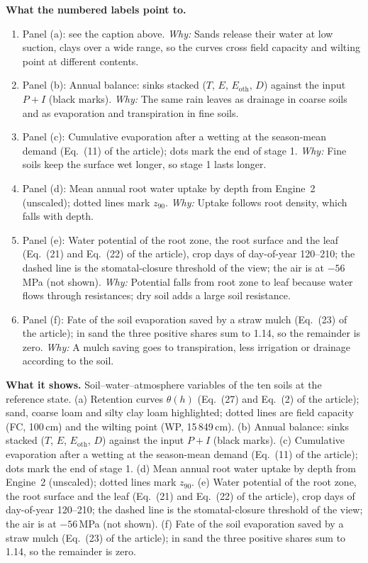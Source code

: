 \textbf{What the numbered labels point to.}
\begin{enumerate}[nosep,label=\protect\circled{\arabic*}]
\item Panel (a): see the caption above. \emph{Why:} Sands release their water at low suction, clays over a wide range, so the curves cross field capacity and wilting point at different contents.
\item Panel (b): Annual balance: sinks stacked ($T$, $E$, $E_{\mathrm{oth}}$, $D$) against the input $P+I$ (black marks). \emph{Why:} The same rain leaves as drainage in coarse soils and as evaporation and transpiration in fine soils.
\item Panel (c): Cumulative evaporation after a wetting at the season-mean demand (Eq.~(11) of the article); dots mark the end of stage 1. \emph{Why:} Fine soils keep the surface wet longer, so stage 1 lasts longer.
\item Panel (d): Mean annual root water uptake by depth from Engine~2 (unscaled); dotted lines mark $z_{90}$. \emph{Why:} Uptake follows root density, which falls with depth.
\item Panel (e): Water potential of the root zone, the root surface and the leaf (Eq.~(21) and Eq.~(22) of the article), crop days of day-of-year 120--210; the dashed line is the stomatal-closure threshold of the view; the air is at $-56$\,MPa (not shown). \emph{Why:} Potential falls from root zone to leaf because water flows through resistances; dry soil adds a large soil resistance.
\item Panel (f): Fate of the soil evaporation saved by a straw mulch (Eq.~(23) of the article); in sand the three positive shares sum to 1.14, so the remainder is zero. \emph{Why:} A mulch saving goes to transpiration, less irrigation or drainage according to the soil.
\end{enumerate}

\textbf{What it shows.} Soil--water--atmosphere variables of the ten soils at the reference state. (a) Retention curves $\theta(h)$ (Eq.~(27) and Eq.~(2) of the article); sand, coarse loam and silty clay loam highlighted; dotted lines are field capacity (FC, 100\,cm) and the wilting point (WP, 15\,849\,cm). (b) Annual balance: sinks stacked ($T$, $E$, $E_{\mathrm{oth}}$, $D$) against the input $P+I$ (black marks). (c) Cumulative evaporation after a wetting at the season-mean demand (Eq.~(11) of the article); dots mark the end of stage 1. (d) Mean annual root water uptake by depth from Engine~2 (unscaled); dotted lines mark $z_{90}$. (e) Water potential of the root zone, the root surface and the leaf (Eq.~(21) and Eq.~(22) of the article), crop days of day-of-year 120--210; the dashed line is the stomatal-closure threshold of the view; the air is at $-56$\,MPa (not shown). (f) Fate of the soil evaporation saved by a straw mulch (Eq.~(23) of the article); in sand the three positive shares sum to 1.14, so the remainder is zero.

